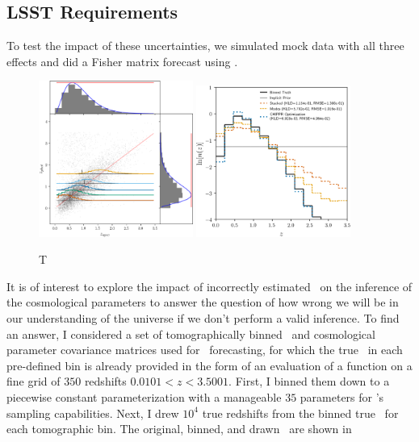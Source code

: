 
\subsection{LSST Requirements}

To test the impact of these uncertainties, we simulated mock data with all three effects and did a Fisher matrix forecast using \cosmolike.

\begin{figure}
	\begin{center}
		\includegraphics[width=0.45\textwidth]{figures/chippr/lsst_scatter.png}
		\includegraphics[width=0.45\textwidth]{figures/chippr/lsst_log_estimators.png}
		\caption{T
		}
	\end{center}
\end{figure}

It is of interest to explore the impact of incorrectly estimated \nz\ on the inference of the cosmological parameters to answer the question of how wrong we will be in our understanding of the universe if we don't perform a valid inference.
To find an answer, I considered a set of tomographically binned \nz\ and cosmological parameter covariance matrices used for \desc\ forecasting, for which the true \nz\ in each pre-defined bin is already provided in the form of an evaluation of a function on a fine grid of $350$ redshifts $0.0101 < z < 3.5001$.
First, I binned them down to a piecewise constant parameterization with a manageable $35$ parameters for \chippr's sampling capabilities.
Next, I drew $10^{4}$ true redshifts from the binned true \nz\ for each tomographic bin.
The original, binned, and drawn \nz\ are shown in 

